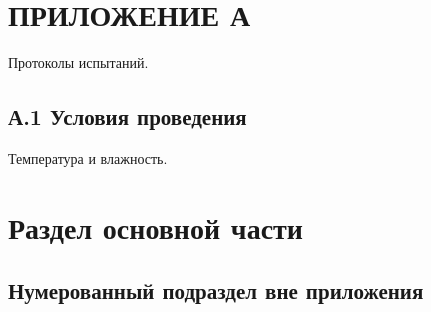 \newpage
\section*{ПРИЛОЖЕНИЕ А}

Протоколы испытаний.

\subsection*{А.1 Условия проведения}

Температура и влажность.

\newpage
\section{Раздел основной части}

\subsection{Нумерованный подраздел вне приложения}
